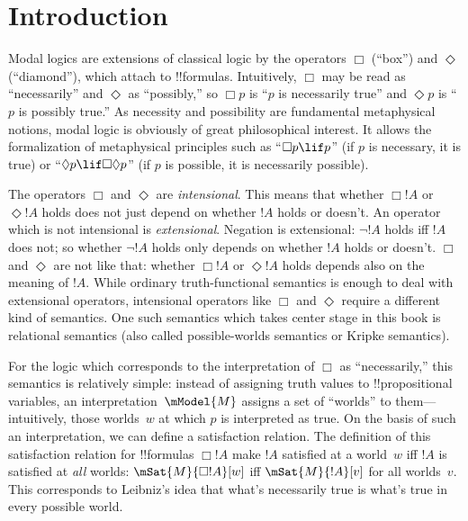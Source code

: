 
\chapter{Introduction}

Modal logics are extensions of classical logic by the operators $\Box$
(``box'') and $\Diamond$ (``diamond''), which attach to !!{formula}s.
Intuitively, $\Box$ may be read as ``necessarily'' and $\Diamond$ as
``possibly,'' so $\Box p$ is ``$p$ is necessarily true'' and $\Diamond
p$ is ``$p$ is possibly true.'' As necessity and possibility are
fundamental metaphysical notions, modal logic is obviously of great
philosophical interest. It allows the formalization of metaphysical
principles such as ``$\Box p \lif p$'' (if $p$ is necessary, it is
true) or ``$\Diamond p \lif \Box\Diamond p$'' (if $p$ is possible,
it is necessarily possible).

The operators $\Box$ and $\Diamond$ are \emph{intensional}. This means
that whether $\Box !A$ or $\Diamond !A$ holds does not just depend on
whether $!A$ holds or doesn't.  An operator which is not intensional
is \emph{extensional}. Negation is extensional: $\lnot !A$ holds iff
$!A$ does not; so whether $\lnot !A$ holds only depends on whether
$!A$ holds or doesn't. $\Box$ and $\Diamond$ are not like that:
whether $\Box !A$ or $\Diamond !A$ holds depends also on the meaning
of $!A$.  While ordinary truth-functional semantics is enough to deal
with extensional operators, intensional operators like $\Box$ and
$\Diamond$ require a different kind of semantics. One such semantics
which takes center stage in this book is relational semantics (also
called possible-worlds semantics or Kripke semantics). 

For the logic which corresponds to the interpretation of $\Box$ as
``necessarily,'' this semantics is relatively simple: instead of
assigning truth values to !!{propositional variable}s, an
interpretation~$\mModel{M}$ assigns a set of ``worlds'' to
them---intuitively, those worlds~$w$ at which $p$ is interpreted as true.
On the basis of such an interpretation, we can define a satisfaction
relation. The definition of this satisfaction relation for
!!{formula}s $\Box !A$ make $!A$ satisfied at a world~$w$ iff $!A$ is
satisfied at \emph{all} worlds: $\mSat{M}{\Box !A}[w]$ iff
$\mSat{M}{!A}[v]$ for all worlds~$v$. This corresponds to Leibniz's
idea that what's necessarily true is what's true in every possible world.

